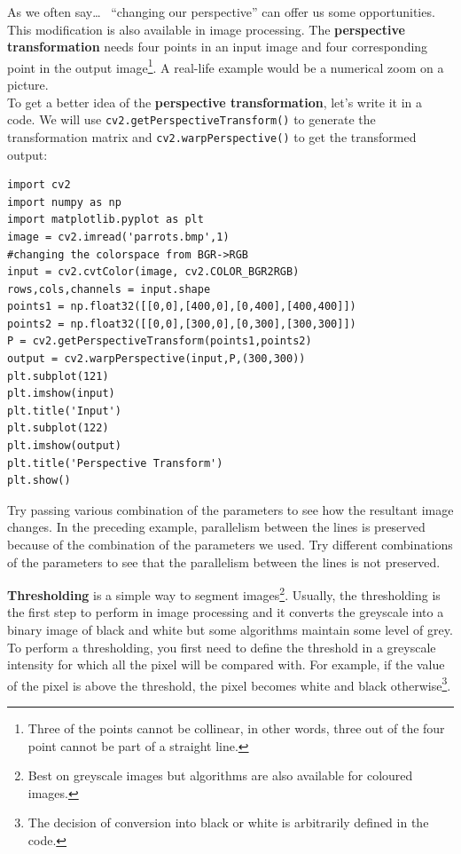 \documentclass{labo}
\begin{document}
As we often say\dots~ ``changing our perspective'' can offer us some opportunities. This modification is also available in image processing. The \textbf{perspective transformation} needs four points in an input image and four corresponding point in the output image\footnote{Three of the points cannot be collinear, in other words, three out of the four point cannot be part of a straight line.}. A real-life example would be a numerical zoom on a picture.\\

To get a better idea of the \textbf{perspective transformation}, let’s write it in a code. We will use \texttt{cv2.getPerspectiveTransform()} to generate the transformation matrix and \texttt{cv2.warpPerspective()} to get the transformed output:

\begin{verbatim}
import cv2 
import numpy as np 
import matplotlib.pyplot as plt 
image = cv2.imread('parrots.bmp',1) 
#changing the colorspace from BGR->RGB 
input = cv2.cvtColor(image, cv2.COLOR_BGR2RGB) 
rows,cols,channels = input.shape 
points1 = np.float32([[0,0],[400,0],[0,400],[400,400]]) 
points2 = np.float32([[0,0],[300,0],[0,300],[300,300]]) 
P = cv2.getPerspectiveTransform(points1,points2) 
output = cv2.warpPerspective(input,P,(300,300)) 
plt.subplot(121)
plt.imshow(input)
plt.title('Input') 
plt.subplot(122)
plt.imshow(output)
plt.title('Perspective Transform') 
plt.show()
\end{verbatim}

\begin{leftbar}
Try passing various combination of the parameters to see how the resultant image changes. In the preceding example, parallelism between the lines is preserved because of the combination of the parameters we used. Try different combinations of the parameters to see that the parallelism between the lines is not preserved.
\end{leftbar}

\textbf{Thresholding} is a simple way to segment images\footnote{Best on greyscale images but algorithms are also available for coloured images.}. Usually, the thresholding is the first step to perform in image processing and it converts the greyscale into a binary image of black and white but some algorithms maintain some level of grey. \\

To perform a thresholding, you first need to define the threshold in a greyscale intensity for which all the pixel will be compared with. For example, if the value of the pixel is above the threshold, the pixel becomes white and black otherwise\footnote{The decision of conversion into black or white is arbitrarily defined in the code.}. \\
\end{document}

